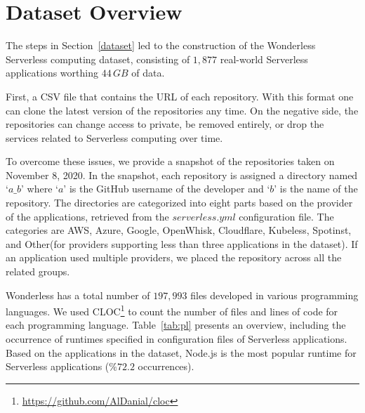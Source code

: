 
\section{Dataset Overview}
\label{schema}

The steps in Section~\ref{dataset} led to the construction of the 
Wonderless Serverless computing dataset, consisting of $1,877$
real-world Serverless applications worthing $44 \, GB$ of data. 

First, a CSV file that contains the URL of each repository. 
With this format one can clone the latest version of the repositories any time. 
On the negative side, the repositories can change access to private, 
be removed entirely, or drop the services related to Serverless computing 
over time. 

To overcome these issues, we provide a snapshot of the 
repositories taken on November 8, 2020. 
In the snapshot, each repository is assigned a directory named `$a\_b$' 
where `$a$' is the GitHub username of the developer and `$b$' is the name of the repository. 
The directories are categorized into eight parts based on the provider of the applications, 
retrieved from the $serverless.yml$ configuration file. 
The categories are AWS, Azure, Google, OpenWhisk, Cloudflare, Kubeless, 
Spotinst, and Other(for providers supporting less than three applications in the dataset).
If an application used multiple providers, we placed the repository across 
all the related groups. 

Wonderless has a total number of $197,993$ files developed in various programming languages. 
We used CLOC\footnote{\url{https://github.com/AlDanial/cloc}} to count the number of files and 
lines of code for each programming language. Table~\ref{tab:pl} presents an overview, 
including the occurrence of runtimes specified in configuration files of Serverless applications. 
Based on the applications in the dataset, Node.js is the most popular runtime 
for Serverless applications ($\%72.2$ occurrences).

